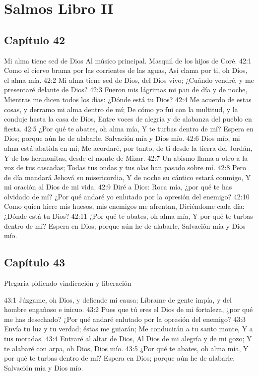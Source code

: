 \chapter{Salmos Libro II}

\section*{Capítulo 42}
Mi alma tiene sed de Dios 
Al músico principal. Masquil de los hijos de Coré. 
42:1 Como el ciervo brama por las corrientes de las aguas, 
Así clama por ti, oh Dios, el alma mía. 
42:2 Mi alma tiene sed de Dios, del Dios vivo; 
¿Cuándo vendré, y me presentaré delante de Dios? 
42:3 Fueron mis lágrimas mi pan de día y de noche, 
Mientras me dicen todos los días: ¿Dónde está tu Dios? 
42:4 Me acuerdo de estas cosas, y derramo mi alma dentro de mí; 
De cómo yo fui con la multitud, y la conduje hasta la casa de Dios, 
Entre voces de alegría y de alabanza del pueblo en fiesta. 
42:5 ¿Por qué te abates, oh alma mía, 
Y te turbas dentro de mí? 
Espera en Dios; porque aún he de alabarle, 
Salvación mía y Dios mío. 
42:6 Dios mío, mi alma está abatida en mí; 
Me acordaré, por tanto, de ti desde la tierra del Jordán, 
Y de los hermonitas, desde el monte de Mizar. 
42:7 Un abismo llama a otro a la voz de tus cascadas; 
Todas tus ondas y tus olas han pasado sobre mí. 
42:8 Pero de día mandará Jehová su misericordia, 
Y de noche su cántico estará conmigo, 
Y mi oración al Dios de mi vida. 
42:9 Diré a Dios: Roca mía, ¿por qué te has olvidado de mí? 
¿Por qué andaré yo enlutado por la opresión del enemigo? 
42:10 Como quien hiere mis huesos, mis enemigos me afrentan, 
Diciéndome cada día: ¿Dónde está tu Dios? 
42:11 ¿Por qué te abates, oh alma mía, 
Y por qué te turbas dentro de mí? 
Espera en Dios; porque aún he de alabarle, 
Salvación mía y Dios mío. 
\section*{Capítulo 43}
Plegaria pidiendo vindicación y liberación 
 
43:1 Júzgame, oh Dios, y defiende mi causa; 
Líbrame de gente impía, y del hombre engañoso e inicuo. 
43:2 Pues que tú eres el Dios de mi fortaleza, ¿por qué me has desechado? 
¿Por qué andaré enlutado por la opresión del enemigo? 
43:3 Envía tu luz y tu verdad; éstas me guiarán; 
Me conducirán a tu santo monte, 
Y a tus moradas. 
43:4 Entraré al altar de Dios, 
Al Dios de mi alegría y de mi gozo; 
Y te alabaré con arpa, oh Dios, Dios mío. 
43:5 ¿Por qué te abates, oh alma mía, 
Y por qué te turbas dentro de mí? 
Espera en Dios; porque aún he de alabarle, 
Salvación mía y Dios mío. 
